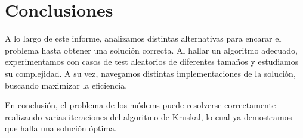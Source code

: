 \section{Conclusiones}
\vspace{1em}

A lo largo de este informe, analizamos distintas alternativas para encarar el problema hasta obtener una solución correcta. Al hallar un algoritmo adecuado, experimentamos con casos de test aleatorios de diferentes tamaños y estudiamos su complejidad. A su vez, navegamos distintas implementaciones de la solución, buscando maximizar la eficiencia. 

\vspace{1em}

En conclusión, el problema de los módems puede resolverse correctamente realizando varias iteraciones del algoritmo de Kruskal, lo cual ya demostramos que halla una solución óptima.
